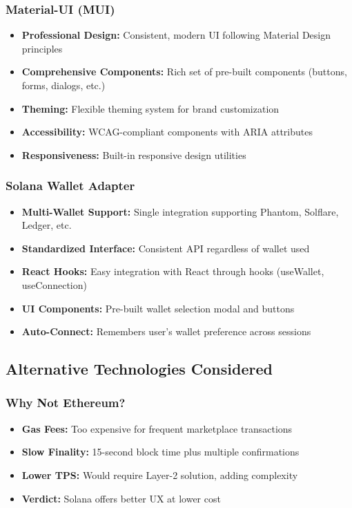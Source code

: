 \documentclass[a4paper,13pt,twoside]{report}
\theoremstyle{definition}
\begin{document}
\subsubsection{Material-UI (MUI)}

\begin{itemize}
    \item \textbf{Professional Design:} Consistent, modern UI following Material Design principles
    \item \textbf{Comprehensive Components:} Rich set of pre-built components (buttons, forms, dialogs, etc.)
    \item \textbf{Theming:} Flexible theming system for brand customization
    \item \textbf{Accessibility:} WCAG-compliant components with ARIA attributes
    \item \textbf{Responsiveness:} Built-in responsive design utilities
\end{itemize}

\subsubsection{Solana Wallet Adapter}

\begin{itemize}
    \item \textbf{Multi-Wallet Support:} Single integration supporting Phantom, Solflare, Ledger, etc.
    \item \textbf{Standardized Interface:} Consistent API regardless of wallet used
    \item \textbf{React Hooks:} Easy integration with React through hooks (useWallet, useConnection)
    \item \textbf{UI Components:} Pre-built wallet selection modal and buttons
    \item \textbf{Auto-Connect:} Remembers user's wallet preference across sessions
\end{itemize}

\subsection{Alternative Technologies Considered}

\subsubsection{Why Not Ethereum?}

\begin{itemize}
    \item \textbf{Gas Fees:} Too expensive for frequent marketplace transactions
    \item \textbf{Slow Finality:} 15-second block time plus multiple confirmations
    \item \textbf{Lower TPS:} Would require Layer-2 solution, adding complexity
    \item \textbf{Verdict:} Solana offers better UX at lower cost
\end{itemize}
\end{document}
